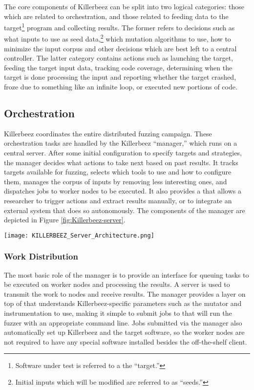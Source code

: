 The core components of Killerbeez can be split into two logical categories:
those which are related to orchestration, and those related to feeding data
to the target\footnote{Software under test is referred to a the ``target.''}
program and collecting results.  The former refers to decisions such as what
inputs to use as seed data,\footnote{Initial inputs which will be modified
are referred to as ``seeds.''} which mutation algorithms to use, how to minimize
the input corpus and other decisions which are best left to a central
controller.  The latter category contains actions such as launching the target,
feeding the target input data, tracking code coverage, determining when the target is
done processing the input and reporting whether the target crashed, froze due
to something like an infinite loop, or executed new portions of code.

\subsection{Orchestration}
Killerbeez coordinates the entire distributed fuzzing
campaign. These orchestration tasks are handled by the Killerbeez ``manager,''
which runs on a central server. After some initial configuration to specify
targets and strategies, the manager decides what actions to take next based on
past results. It tracks targets available for fuzzing, selects which tools to
use and how to configure them, manages the corpus of inputs by removing
less interesting ones, and dispatches jobs to worker nodes to be executed.  It also
provides a \REST{} \API{} that allows a researcher to trigger actions and
extract results manually, or to integrate an external system that
does so autonomously. The components of the manager are depicted in Figure
\ref{fig:Killerbeez-server}.

\begin{figure*}[htb]
\centering
\texttt{[image: KILLERBEEZ\_Server\_Architecture.png]}
\caption{Killerbeez Server Architecture}
\label{fig:Killerbeez-server}
\end{figure*}

\subsubsection{Work Distribution}
The most basic role of the manager is to provide an interface for queuing tasks
to be executed on worker nodes and processing the results. A \BOINC{} server is
used to transmit the work to nodes and receive results. The manager provides a
layer on top of \BOINC{} that understands Killerbeez-specific parameters such as
the mutator and instrumentation to use, making it simple to submit jobs to
\BOINC{} that will run the fuzzer with an appropriate command line. Jobs
submitted via the manager also automatically set up Killerbeez and the target
software, so the worker nodes are not required to have any special software
installed besides the off-the-shelf \BOINC{} client.

